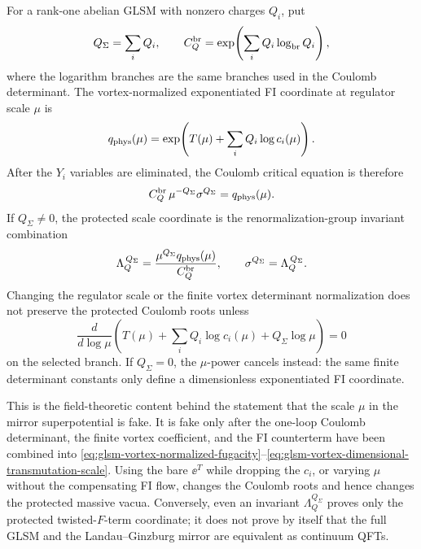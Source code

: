 \begin{controlledapproximation}
\label{ca:glsm-vortex-fugacity-transmutation}
For a rank-one abelian GLSM with nonzero charges \(Q_i\), put
\[
  Q_\Sigma=\sum_i Q_i,\qquad
  C_Q^{\rm br}
  =
  \exp\!\left(\sum_i Q_i\log_{\rm br}Q_i\right),
\]
where the logarithm branches are the same branches used in the Coulomb
determinant.  The vortex-normalized exponentiated FI coordinate at regulator
scale \(\mu\) is
\begin{equation}
  q_{\rm phys}(\mu)
  =
  \exp\!\left(T(\mu)+\sum_iQ_i\log c_i(\mu)\right).
  \label{eq:glsm-vortex-normalized-fugacity}
\end{equation}
After the \(Y_i\) variables are eliminated, the Coulomb critical equation is
therefore
\begin{equation}
  C_Q^{\rm br}\,\mu^{-Q_\Sigma}\sigma^{Q_\Sigma}
  =
  q_{\rm phys}(\mu).
  \label{eq:glsm-vortex-normalized-coulomb-scale-equation}
\end{equation}
If \(Q_\Sigma\neq0\), the protected scale coordinate is the
renormalization-group invariant combination
\begin{equation}
  \Lambda_Q^{\,Q_\Sigma}
  =
  \frac{\mu^{Q_\Sigma}q_{\rm phys}(\mu)}{C_Q^{\rm br}},
  \qquad
  \sigma^{Q_\Sigma}=\Lambda_Q^{\,Q_\Sigma}.
  \label{eq:glsm-vortex-dimensional-transmutation-scale}
\end{equation}
Changing the regulator scale or the finite vortex determinant normalization
does not preserve the protected Coulomb roots unless
\begin{equation}
  \frac{d}{d\log\mu}
  \left(
    T(\mu)+\sum_iQ_i\log c_i(\mu)+Q_\Sigma\log\mu
  \right)
  =
  0
  \label{eq:glsm-vortex-fugacity-rg-invariance}
\end{equation}
on the selected branch.  If \(Q_\Sigma=0\), the \(\mu\)-power cancels instead:
the same finite determinant constants only define a dimensionless
exponentiated FI coordinate.

This is the field-theoretic content behind the statement that the scale
\(\mu\) in the mirror superpotential is fake.  It is fake only after the
one-loop Coulomb determinant, the finite vortex coefficient, and the FI
counterterm have been combined into
\eqref{eq:glsm-vortex-normalized-fugacity}--\eqref{eq:glsm-vortex-dimensional-transmutation-scale}.
Using the bare \(\ee^T\) while dropping the \(c_i\), or varying \(\mu\) without
the compensating FI flow, changes the Coulomb roots and hence changes the
protected massive vacua.  Conversely, even an invariant
\(\Lambda_Q^{Q_\Sigma}\) proves only the protected twisted-\(F\)-term
coordinate; it does not prove by itself that the full GLSM and the
Landau--Ginzburg mirror are equivalent as continuum QFTs.
\end{controlledapproximation}


